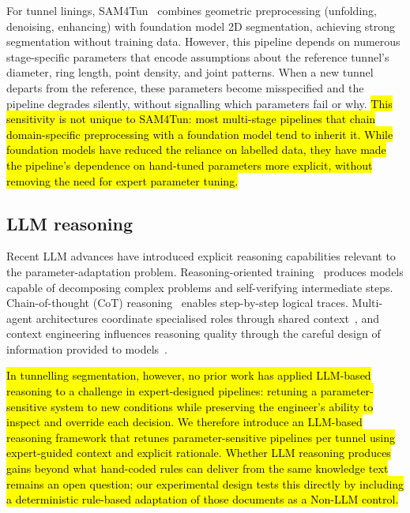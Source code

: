 \documentclass[a4paper,fleqn]{cas-dc}
\begin{document}
{For tunnel linings, SAM4Tun~\cite{ye2025sam4tun} combines geometric preprocessing (unfolding, denoising, enhancing) with foundation model 2D segmentation, achieving strong segmentation without training data. However, this pipeline depends on numerous stage-specific parameters that encode assumptions about the reference tunnel's diameter, ring length, point density, and joint patterns. When a new tunnel departs from the reference, these parameters become misspecified and the pipeline degrades silently, without signalling which parameters fail or why. \hl{This sensitivity is not unique to SAM4Tun: most multi-stage pipelines that chain domain-specific preprocessing with a foundation model tend to inherit it. While foundation models have reduced the reliance on labelled data, they have made the pipeline's dependence on hand-tuned parameters more explicit, without removing the need for expert parameter tuning.}

\subsection{LLM reasoning}

Recent LLM advances have introduced explicit reasoning capabilities relevant to the parameter-adaptation problem. Reasoning-oriented training~\cite{ouyang2022training, deepseek2025analysis, chua2025deepseek, xiang2025metacot, openai2025o3, openai2025reasoningbestpractices} produces models capable of decomposing complex problems and self-verifying intermediate steps. Chain-of-thought (CoT) reasoning~\cite{wei2023cot, kojima2023zeroshot} enables step-by-step logical traces. Multi-agent architectures coordinate specialised roles through shared context~\cite{hong2024metagpt, qian2024chatdev, chen2024comm, zhang2023igniting, zhang2024chain}, and context engineering influences reasoning quality through the careful design of information provided to models~\cite{xu2024retrieval, mei2025survey, anthropic2025context}.

\hl{In tunnelling segmentation, however, no prior work has applied LLM-based reasoning to a challenge in expert-designed pipelines: retuning a parameter-sensitive system to new conditions while preserving the engineer's ability to inspect and override each decision. We therefore introduce an LLM-based reasoning framework that retunes parameter-sensitive pipelines per tunnel using expert-guided context and explicit rationale. Whether LLM reasoning produces gains beyond what hand-coded rules can deliver from the same knowledge text remains an open question; our experimental design tests this directly by including a deterministic rule-based adaptation of those documents as a Non-LLM control.}


}
\end{document}
